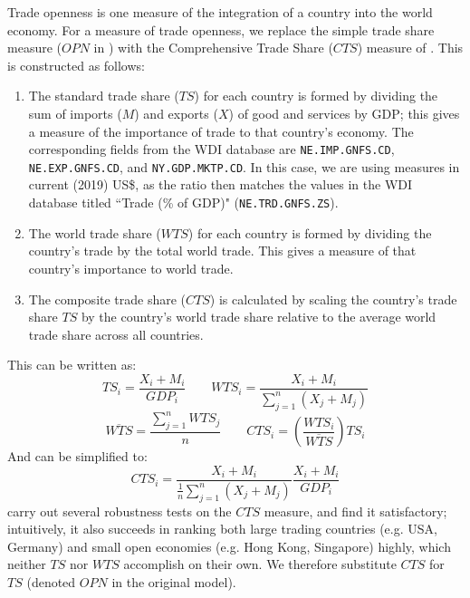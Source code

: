 \documentclass[12pt,a4paper]{article}
\begin{document}
Trade openness is one measure of the integration of a country into the world economy. 
For a measure of trade openness, we replace the simple trade share measure ($OPN$ in \citealt{rafiqUrbanizationOpennessEmissions2016}) with the Comprehensive Trade Share  ($CTS$) measure of \cite{squalliNewMeasureTrade2011}.
This is constructed as follows:
\begin{enumerate}
\item The standard trade share ($TS$) for each country is formed by dividing the sum of imports ($M$) and exports ($X$) of good and services by GDP; this gives a measure of the importance of trade to that country's economy.
The corresponding fields from the WDI database are \texttt{NE.IMP.GNFS.CD}, \texttt{NE.EXP.GNFS.CD}, and \texttt{NY.GDP.MKTP.CD}.
In this case, we are using measures in current (2019) US\$, as the ratio then matches the values in the WDI database titled ``Trade (\% of GDP)" (\texttt{NE.TRD.GNFS.ZS}).
\item The world trade share ($WTS$) for each country is formed by dividing the country's trade by the total world trade. 
This gives a measure of that country's importance to world trade.
\item The composite trade share ($CTS$) is calculated by scaling the country's trade share $TS$ by the country's world trade share relative to the average world trade share across all countries.
\end{enumerate}

This can be written as:
\begin{equation*}
TS_i = \frac{X_i + M_i}{GDP_i}
\qquad
WTS_i = \frac{X_i + M_i}{\sum_{j=1}^{n} ( X_j + M_j )}
\end{equation*}
\begin{equation*}
\overline{WTS} = \frac{\sum_{j=1}^{n} WTS_j}{n}
\qquad
CTS_i = \left( \frac{WTS_i}{\overline{WTS}} \right) TS_i
\end{equation*}
And can be simplified to:
\begin{equation}
CTS_i = \frac{X_i + M_i}{\frac{1}{n} \sum_{j=1}^{n} ( X_j + M_j )} \frac{X_i + M_i}{GDP_i}
\end{equation}
\cite{squalliNewMeasureTrade2011} carry out several robustness tests on the $CTS$ measure, and find it satisfactory; intuitively, it also succeeds in ranking both large trading countries (e.g. USA, Germany) and small open economies (e.g. Hong Kong, Singapore) highly, which neither $TS$ nor $WTS$ accomplish on their own.
We therefore substitute $CTS$ for $TS$ (denoted $OPN$ in the original model).
\end{document}

